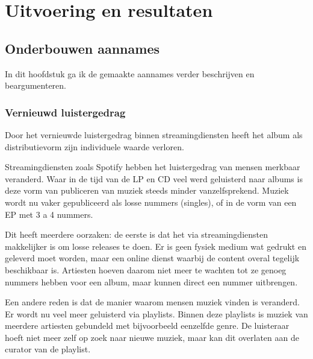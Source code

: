 \section{Uitvoering en resultaten}

\subsection{Onderbouwen aannames}

In dit hoofdstuk ga ik de gemaakte aannames verder beschrijven en beargumenteren.

\subsubsection*{Vernieuwd luistergedrag}

\begin{quotebox}
Door het vernieuwde luistergedrag binnen streamingdiensten heeft het album als distributievorm zijn individuele waarde verloren.
\end{quotebox}
Streamingdiensten zoals Spotify hebben het luistergedrag van mensen merkbaar veranderd. Waar in de tijd van de LP en CD veel werd geluisterd naar albums is deze vorm van publiceren van muziek steeds minder vanzelfsprekend. Muziek wordt nu vaker gepubliceerd als losse nummers (singles), of in de vorm van een EP met 3 a 4 nummers.

Dit heeft meerdere oorzaken: de eerste is dat het via streamingdiensten makkelijker is om losse releases te doen. Er is geen fysiek medium wat gedrukt en geleverd moet worden, maar een online dienst waarbij de content overal tegelijk beschikbaar is. Artiesten hoeven daarom niet meer te wachten tot ze genoeg nummers hebben voor een album, maar kunnen direct een nummer uitbrengen.

Een andere reden is dat de manier waarom mensen muziek vinden is veranderd. Er wordt nu veel meer geluisterd via playlists. Binnen deze playlists is muziek van meerdere artiesten gebundeld met bijvoorbeeld eenzelfde genre. De luisteraar hoeft niet meer zelf op zoek naar nieuwe muziek, maar kan dit overlaten aan de curator van de playlist.

